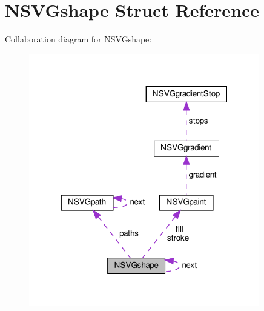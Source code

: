 \hypertarget{structNSVGshape}{}\section{N\+S\+V\+Gshape Struct Reference}
\label{structNSVGshape}


Collaboration diagram for N\+S\+V\+Gshape\+:
\nopagebreak
\begin{figure}[H]
\begin{center}
\leavevmode
\includegraphics[width=285pt]{structNSVGshape__coll__graph}
\end{center}
\end{figure}
